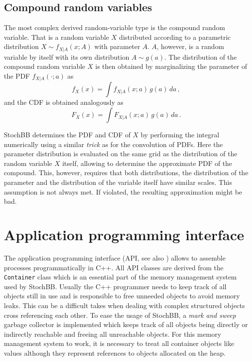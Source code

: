 \documentclass[a4paper, 10pt]{paper}
\newcommand{\code}[1]{\texttt{#1}}
\newcommand{\class}[1]{\code{#1}}
\begin{document}
\subsection{Compound random variables}
The most complex derived random-variable type is the compound random variable. That is a random variable
$X$ distributed according to a parametric distribution $X\sim f_{X|A}(x;A)$ with parameter $A$. $A$, however, 
is a random variable by itself with its own distribution $A\sim g(a)$. The distribution of the compound 
random variable $X$ is then obtained by marginalizing the parameter of the PDF $f_{X|A}(\cdot;a)$ as 
\begin{equation}
 f_X(x) = \int f_{X|A}(x;a)\,g(a)\,da\,,\nonumber
\end{equation}
and the CDF is obtained analogously as
\begin{equation}
 F_X(x) = \int F_{X|A}(x;a)\,g(a)\,da\,.\nonumber
\end{equation}

StochBB determines the PDF and CDF of $X$ by performing the integral numerically using a similar \emph{trick}
as for the convolution of PDFs. Here the parameter distribution is evaluated on the same grid as the distribution
of the random variable $X$ itself, allowing to determine the approximate PDF of the compound. This, however, requires 
that both distributions, the distribution of the parameter and the distribution of the variable itself have similar 
scales. This assumption is not always met. If violated, the resulting approximation might be bad.


\section{Application programming interface} \label{sec:api}
The application programming interface (API, see also \cite{stochbbapi}) allows to assemble processes
programmatically in C++.
All API classes are derived from the \class{Container} class which is an essential part of the
memory management system used by StochBB. Usually the C++ programmer needs to keep track of all
objects still in use and is responsible to free unneeded objects to avoid memory leaks. This can
be a difficult takes when dealing with complex structured objects cross referencing each other.
To ease the usage of StochBB, a \emph{mark and sweep} garbage collector is implemented which keeps track
of all objects being directly or indirectly reachable and freeing all unreachable objects. For
this memory management system to work, it is necessary to treat all container objects like values
although they represent references to objects allocated on the heap.
\end{document}
